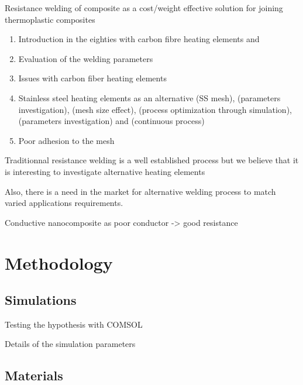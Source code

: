 \documentclass[11pt,review,times]{elsarticle}
\begin{document}
Resistance welding of composite as a cost/weight effective solution for joining thermoplastic composites
\begin{enumerate}
	\item Introduction in the eighties with carbon fibre heating elements \cite{houghton1984bonding} and \cite{Eveno1988} 
	\item Evaluation of the welding parameters \cite{Ageorges2000a}
	\item Issues with carbon fiber heating elements \cite{McKnight1997}
	\item Stainless steel heating elements as an alternative (SS mesh)\cite{Hou1999a}, (parameters investigation)\cite{Dube2007}, (mesh size effect)\cite{Dube2012a}, (process optimization through simulation)\cite{Talbot2013}, (parameters investigation)\cite{Shi2014} and (continuous process)\cite{Shi2015a} 
	\item Poor adhesion to the mesh
\end{enumerate}

Traditionnal resistance welding is a well established process but we believe that it is interesting to investigate alternative heating elements 

Also, there is a need in the market for alternative welding process to match varied applications requirements. \cite{CompositeWorldSloan2018}

Conductive nanocomposite as poor conductor -> good resistance

							\section{Methodology}

\subsection{Simulations}

Testing the hypothesis with COMSOL

Details of the simulation parameters


\subsection{Materials}
\end{document}
